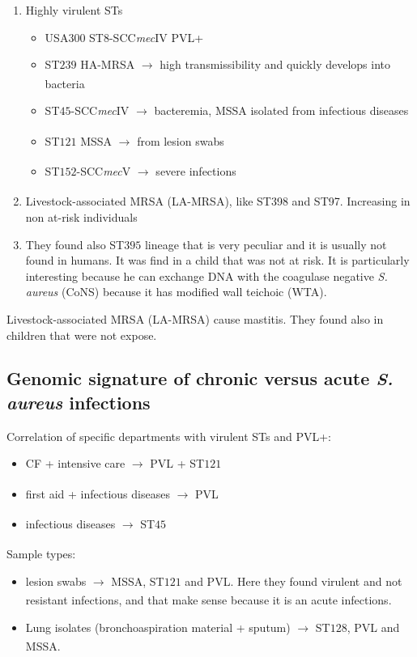 \begin{enumerate}
    \item Highly virulent STs
    \begin{itemize}
        \item USA$300$ ST$8$-SCC\emph{mec}IV PVL+
        \item ST$239$ HA-MRSA $\xrightarrow[]{}$ high transmissibility and quickly develops into bacteria
        \item ST$45$-SCC\emph{mec}IV $\xrightarrow[]{}$ bacteremia, MSSA isolated from infectious diseases
        \item ST$121$ MSSA $\xrightarrow[]{}$ from lesion swabs
        \item ST$152$-SCC\emph{mec}V $\xrightarrow[]{}$ severe infections
    \end{itemize}
    \item Livestock-associated MRSA (LA-MRSA), like ST398 and ST97. Increasing in non at-risk individuals 
    \item They found also ST$395$ lineage that is very peculiar and it is usually not found in humans. It was find in a child that was not at risk. It is particularly interesting because he can exchange DNA with the coagulase negative \emph{S. aureus} (CoNS) because it has modified wall teichoic (WTA).
\end{enumerate}
Livestock-associated MRSA (LA-MRSA) cause mastitis. They found also in children that were not expose. 

\subsection{Genomic signature of chronic versus acute \emph{S. aureus} infections}

Correlation of specific departments with virulent STs and PVL+:

\begin{itemize}
    \item CF + intensive care $\xrightarrow[]{}$ PVL + ST$121$ 
    \item first aid + infectious diseases $\xrightarrow[]{}$ PVL
    \item infectious diseases $\xrightarrow[]{}$ ST$45$
\end{itemize}

Sample types: 

\begin{itemize}
    \item lesion swabs $\xrightarrow[]{}$ MSSA, ST$121$ and PVL. Here they found virulent and not resistant infections, and that make sense because it is an acute infections.
    \item Lung isolates (bronchoaspiration material + sputum) $\xrightarrow[]{}$ ST$128$, PVL and MSSA. 
\end{itemize}

